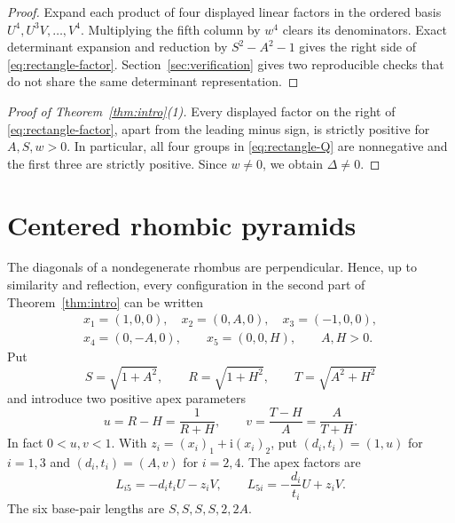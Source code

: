 \documentclass[11pt]{amsart}
\theoremstyle{definition}
\newcommand{\ii}{\mathrm{i}}
\newcommand{\DeltaA}{\mathit{\Delta}}
\begin{document}
\begin{proof}
Expand each product of four displayed linear factors in the ordered basis
$U^4,U^3V,\ldots,V^4$. Multiplying the fifth column by $w^4$ clears its
denominators. Exact determinant expansion and reduction by
$S^2-A^2-1$ gives the right side of \eqref{eq:rectangle-factor}.
Section~\ref{sec:verification} gives two reproducible checks that do not share
the same determinant representation.
\end{proof}

\begin{proof}[Proof of Theorem~\ref{thm:intro}(1)]
Every displayed factor on the right of \eqref{eq:rectangle-factor}, apart
from the leading minus sign, is strictly positive for $A,S,w>0$. In
particular, all four groups in \eqref{eq:rectangle-Q} are nonnegative and the
first three are strictly positive. Since $w\ne0$, we obtain
$\DeltaA\ne0$.
\end{proof}

\section{Centered rhombic pyramids}\label{sec:rhombus}

The diagonals of a nondegenerate rhombus are perpendicular. Hence, up to
similarity and reflection, every configuration in the second part of
Theorem~\ref{thm:intro} can be written
\begin{equation}\label{eq:rhombus-points}
\begin{gathered}
x_1=(1,0,0),\quad x_2=(0,A,0),\quad x_3=(-1,0,0),\\
x_4=(0,-A,0),\qquad x_5=(0,0,H),\qquad A,H>0.
\end{gathered}
\end{equation}
Put
\[
S=\sqrt{1+A^2},\qquad R=\sqrt{1+H^2},\qquad
T=\sqrt{A^2+H^2}
\]
and introduce two positive apex parameters
\begin{equation}\label{eq:uv}
u=R-H=\frac1{R+H},\qquad
v=\frac{T-H}{A}=\frac{A}{T+H}.
\end{equation}
In fact $0<u,v<1$. With $z_i=(x_i)_1+\ii(x_i)_2$, put
$(d_i,t_i)=(1,u)$ for $i=1,3$ and $(d_i,t_i)=(A,v)$ for
$i=2,4$. The apex factors are
\[
L_{i5}=-d_it_iU-z_iV,\qquad
L_{5i}=-\frac{d_i}{t_i}U+z_iV.
\]
The six base-pair lengths are $S,S,S,S,2,2A$.
\end{document}
